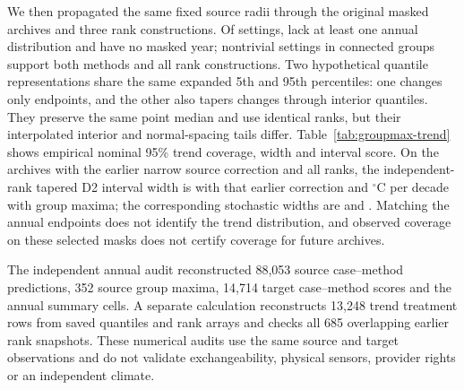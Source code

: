 We then propagated the same fixed source radii through the original masked archives and three rank constructions. Of \GMAllArchives{} settings, \GMNoAnnual{} lack at least one annual distribution and \GMNoGap{} have no masked year; \GMTrendCases{} nontrivial settings in \GMTrendGroups{} connected groups support both methods and all rank constructions. Two hypothetical quantile representations share the same expanded 5th and 95th percentiles: one changes only endpoints, and the other also tapers changes through interior quantiles. They preserve the same point median and use identical ranks, but their interpolated interior and normal-spacing tails differ. Table~\ref{tab:groupmax-trend} shows empirical nominal 95\% trend coverage, width and interval score. On the \GMOverlapCases{} archives with the earlier narrow source correction and all ranks, the independent-rank tapered D2 interval width is \GMOverlapDOldWidth{} with that earlier correction and \GMOverlapDNewWidth{} $^{\circ}$C per decade with group maxima; the corresponding stochastic widths are \GMOverlapCOldWidth{} and \GMOverlapCNewWidth{}. Matching the annual endpoints does not identify the trend distribution, and observed coverage on these selected masks does not certify coverage for future archives.

\begin{table}[ht]\caption{Nominal 95\% forward trend intervals on \GMTrendCases{} common nontrivial archives. Each entry is baseline / endpoint-only / tapered; widths and interval scores are $^{\circ}$C per decade.}\label{tab:groupmax-trend}\centering\small
{}\end{table}

The independent annual audit reconstructed 88,053 source case--method predictions, 352 source group maxima, 14,714 target case--method scores and the annual summary cells. A separate calculation reconstructs 13,248 trend treatment rows from saved quantiles and rank arrays and checks all 685 overlapping earlier rank snapshots. These numerical audits use the same source and target observations and do not validate exchangeability, physical sensors, provider rights or an independent climate.
